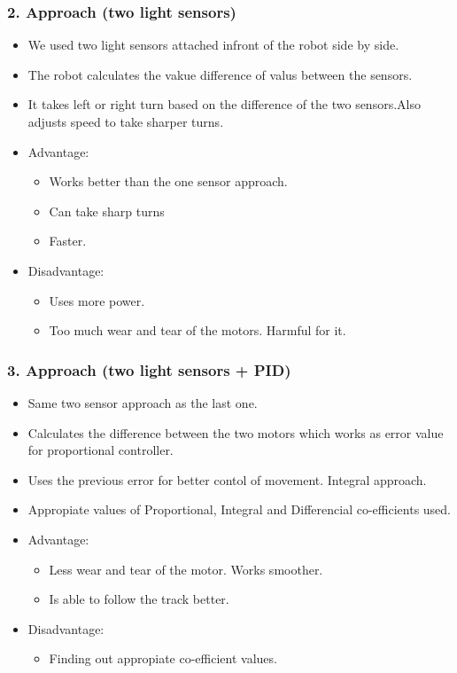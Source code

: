 \documentclass{beamer}
\begin{document}
	\begin{frame}
		\frametitle{2. Approach (two light sensors)}
		\begin{itemize}
			\item We used two light sensors attached infront of the robot side  by side.
			\item The robot calculates the vakue difference of valus between the sensors.
			\item It takes left or right turn based on the difference of the two sensors.Also adjusts speed to take sharper turns.
			\item Advantage:
			\begin{itemize}
				\item Works better than the one sensor approach.
				\item Can take sharp turns
				\item Faster.
			\end{itemize}
			\item Disadvantage:
			\begin{itemize}
				\item Uses more power.
				\item Too much wear and tear of the motors. Harmful for it.
			\end{itemize}
		\end{itemize}
	\end{frame}
	\begin{frame}
		\frametitle{3. Approach (two light sensors + PID)}
		\begin{itemize}
			\item Same two sensor approach as the last one.
			\item Calculates the difference between the two motors which works as error value for proportional controller.
			\item Uses the previous error for better contol of movement. Integral approach.
			\item Appropiate values of Proportional, Integral and Differencial co-efficients used.
			\item Advantage:
			\begin{itemize}
				\item Less wear and tear of the motor. Works smoother.
				\item Is able to follow the track better.
			\end{itemize}
			\item Disadvantage:
			\begin{itemize}
				\item Finding out appropiate co-efficient values.
			\end{itemize}
		\end{itemize} 
	\end{frame}
\end{document}
